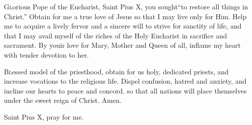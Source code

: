 {\centering\Large{\MakeUppercase{}}\par}

\begin{enpars}

\lettrine{G}{l}orious Pope of the Eucharist, Saint Pius X, you sought``to restore all things in Christ.'' Obtain for me a true love of Jesus so that I may live only for Him. Help me to acquire a lively fervor and a sincere will to strive for sanctity of life, and that I may avail myself of the riches of the Holy Eucharist in sacrifice and sacrament. By youir love for Mary, Mother and Queen of all, inflame my heart with tender devotion to her.

\lettrine{B}{l}essed model of the priesthood, obtain for us holy, dedicated priests, and increase vocations to the religious life. Dispel confusion, hatred and anxiety, and incline our hearts to peace and concord. so that all nations will place themselves under the sweet reign of Christ. Amen.

Saint Pius X, pray for me.

\end{enpars}


